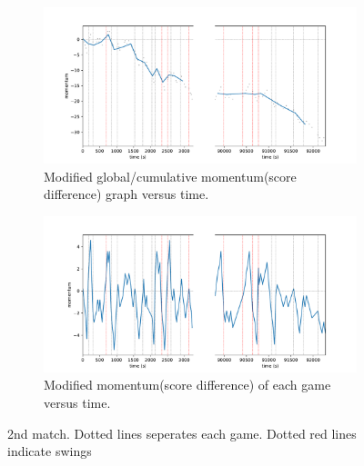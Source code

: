 \documentclass[11pt,a4paper]{article}
\begin{document}
	\begin{figure}[H]
		\centering
		
		\begin{subfigure}[b]{\textwidth}
			\includegraphics[width=1\linewidth]{pics/fig4_2}
			\caption{Modified global/cumulative momentum(score difference) graph versus time.}
			\label{fig:topfig4_2}
		\end{subfigure}
		
		\vspace{1cm}
		
		\begin{subfigure}[b]{1.0\textwidth}
			\includegraphics[width=1\linewidth]{pics/fig5_2}
			\caption{Modified momentum(score difference) of each game versus time.}
			\label{fig:bottomfig5_2}
		\end{subfigure}
		
		\caption{2nd match. Dotted lines seperates each game. Dotted red lines indicate swings}
		\label{fig:both_figures2}
	\end{figure}
	
\end{document}
